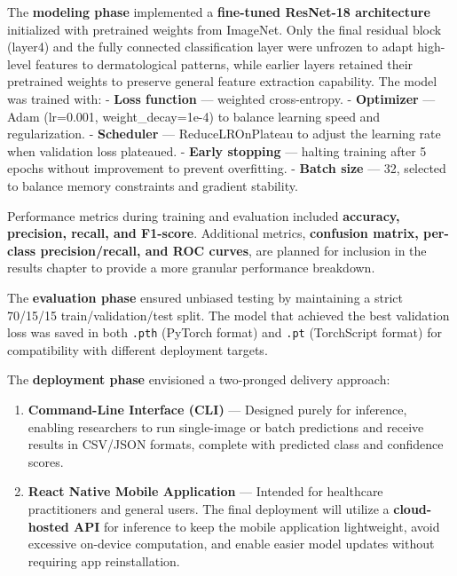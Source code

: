 \documentclass[
  12pt,
  oneside]{article}
\providecommand{\tightlist}{%
  \setlength{\itemsep}{0pt}\setlength{\parskip}{0pt}}
\begin{document}
The \textbf{modeling phase} implemented a \textbf{fine-tuned ResNet-18
architecture} initialized with pretrained weights from ImageNet. Only
the final residual block (layer4) and the fully connected classification
layer were unfrozen to adapt high-level features to dermatological
patterns, while earlier layers retained their pretrained weights to
preserve general feature extraction capability. The model was trained
with: - \textbf{Loss function} --- weighted cross-entropy. -
\textbf{Optimizer} --- Adam (lr=0.001, weight\_decay=1e-4) to balance
learning speed and regularization. - \textbf{Scheduler} ---
ReduceLROnPlateau to adjust the learning rate when validation loss
plateaued. - \textbf{Early stopping} --- halting training after 5 epochs
without improvement to prevent overfitting. - \textbf{Batch size} ---
32, selected to balance memory constraints and gradient stability.

Performance metrics during training and evaluation included
\textbf{accuracy, precision, recall, and F1-score}. Additional metrics,
\textbf{confusion matrix, per-class precision/recall, and ROC curves},
are planned for inclusion in the results chapter to provide a more
granular performance breakdown.

The \textbf{evaluation phase} ensured unbiased testing by maintaining a
strict 70/15/15 train/validation/test split. The model that achieved the
best validation loss was saved in both \texttt{.pth} (PyTorch format)
and \texttt{.pt} (TorchScript format) for compatibility with different
deployment targets.

The \textbf{deployment phase} envisioned a two-pronged delivery
approach:

\begin{enumerate}
\def\labelenumi{\arabic{enumi}.}
\tightlist
\item
  \textbf{Command-Line Interface (CLI)} --- Designed purely for
  inference, enabling researchers to run single-image or batch
  predictions and receive results in CSV/JSON formats, complete with
  predicted class and confidence scores.
\item
  \textbf{React Native Mobile Application} --- Intended for healthcare
  practitioners and general users. The final deployment will utilize a
  \textbf{cloud-hosted API} for inference to keep the mobile application
  lightweight, avoid excessive on-device computation, and enable easier
  model updates without requiring app reinstallation.
\end{enumerate}
\end{document}
